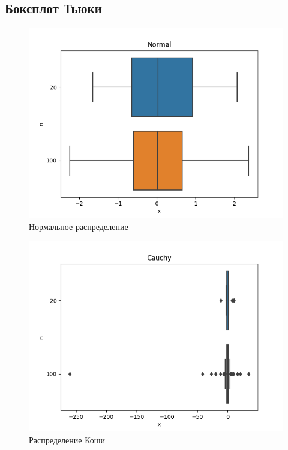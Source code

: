 \documentclass[12pt]{article}
\begin{document}
\FloatBarrier
\subsection{Боксплот Тьюки}
\begin{figure}[ht]
  \centering
  \includegraphics[width=0.4\paperwidth ]{../images/boxplots/Normal.png}
  \caption{Нормальное распределение}
\end{figure}

\begin{figure}[ht]
  \centering
  \includegraphics[width=0.4\paperwidth ]{../images/boxplots/Cauchy.png}
  \caption{Распределение Коши}
\end{figure}
\end{document}
